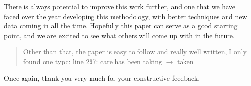 There is always potential to improve this work further, and one that we have faced over the year developing this methodology, with better techniques and new data coming in all the time.
Hopefully this paper can serve as a good starting point, and we are excited to see what others will come up with in the future.


\begin{quote}
\color{blue}
Other than that, the paper is easy to follow and really well written, I only found one
typo:
 line 297: care has been taking $\rightarrow$ taken
\end{quote}

Once again, thank you very much for your constructive feedback.



